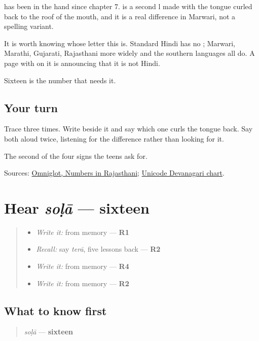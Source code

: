 \textbf{} has been in the hand since chapter 7. \textbf{} is a second l made with the tongue curled back to the roof of the mouth, and it is a real difference in Marwari, not a spelling variant.

It is worth knowing whose letter this is. Standard Hindi has no \textbf{}; Marwari, Marathi, Gujarati, Rajasthani more widely and the southern languages all do. A page with \textbf{} on it is announcing that it is not Hindi.

Sixteen is the number that needs it.

\subsection*{Your turn}
Trace \textbf{} three times. Write \textbf{} beside it and say which one curls the tongue back. Say both aloud twice, listening for the difference rather than looking for it.

\begin{tcolorbox}[breakable,colback=teal!4,colframe=teal!35!black,title={Before you move on}]
The second of the four signs the teens ask for.

Sources: \href{https://www.omniglot.com/language/numbers/rajasthani.htm}{Omniglot, Numbers in Rajasthani}; \href{https://www.unicode.org/charts/PDF/U0900.pdf}{Unicode Devanagari chart}.
\end{tcolorbox}
\section[soḷā]{Hear \emph{soḷā} — sixteen}

\label{lesson:MW-C38-hear-sola}



\begin{quote}
\begin{itemize}
\raggedright
  \item \emph{Write it:} \textbf{} from memory — \textbf{R1}
  \item \emph{Recall:} say \emph{terā}, five lessons back — \textbf{R2}
  \item \emph{Write it:} \textbf{} from memory — \textbf{R4}
  \item \emph{Write it:} \textbf{} from memory — \textbf{R2}
\end{itemize}
\end{quote}

\subsection*{What to know first}
\begin{quote}
\emph{soḷā} — \textbf{sixteen}
\end{quote}

